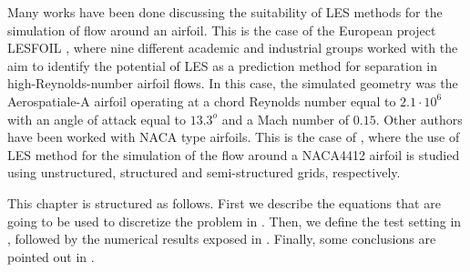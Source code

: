Many works have been done discussing the suitability of LES methods for the simulation of flow around an airfoil. This is the case of the European project LESFOIL \cite{davidson_lesfoil:_2012}, where nine different academic and industrial groups worked with the aim to identify the potential of LES as a prediction method for separation in high-Reynolds-number airfoil flows. In this case, the simulated geometry was the Aerospatiale-A airfoil operating at a chord Reynolds number equal to $2.1\cdot10^6$ with an angle of attack equal to $13.3^o$ and a Mach number of $0.15$. Other authors have been worked with NACA type airfoils. This is the case of \cite{jansen_stabilized_1999, kaltenbach_large-eddy_1995, schmidt_assessment_????}, where the use of LES method for the simulation of the flow around a NACA4412 airfoil is studied using unstructured, structured and semi-structured grids, respectively.

This chapter is structured as follows. First we describe the equations that are going to be used to discretize the problem in . Then, we define the test setting in , followed by the numerical results exposed in . Finally, some conclusions are pointed out in .

%

